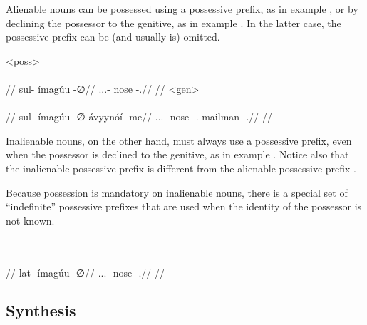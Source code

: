 Alienable nouns can be possessed using a possessive prefix, as in example , or by declining the possessor to the genitive, as in example . In the latter case, the possessive prefix can be (and usually is) omitted.

	\a<poss>\begingl
		\glpreamble{}\\
		\\
		//
		\gla sul- ímagúu -∅//
		\glb \Tps.\Prox.\Poss.\Inal- nose -\Dir.\Sg//
		\glft {}//
		\endgl
	\a<gen>\begingl
		\glpreamble{}\\
		\\
		//
		\gla sul- ímagúu -∅ ávyynóí -me//
		\glb \Tps.\Prox.\Poss.\Inal- nose -\Dir.\Sg{} mailman -\Gen.\Sg//
		\glft {}//
	\endgl
\xe

Inalienable nouns, on the other hand, must always use a possessive prefix, even when the possessor is declined to the genitive, as in example . Notice also that the inalienable possessive prefix  is different from the alienable possessive prefix .

Because possession is mandatory on inalienable nouns, there is a special set of \enquote{indefinite} possessive prefixes that are used when the identity of the possessor is not known.

	\begingl
		\glpreamble{}\\
		\\
		//
		\gla lat- ímagúu -∅//
		\glb \Tps.\Indf.\Poss.\Inal- nose -\Dir.\Sg//
		\glft {}//
	\endgl
\xe


\subsection{Synthesis}
\label{sec:synthesis}

